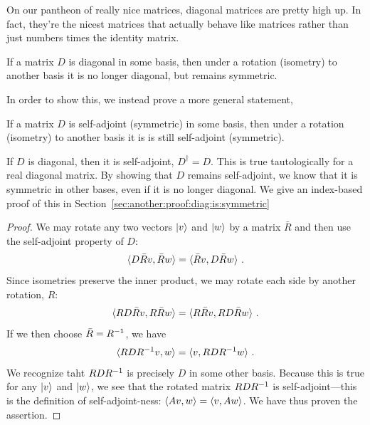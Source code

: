 \documentclass[12pt, oneside]{report}    %
\begin{document}
On our pantheon of really nice matrices, diagonal matrices are pretty high up. In fact, they're the nicest matrices that actually behave like matrices rather than just numbers times the identity matrix. 
\begin{bigidea}
If a matrix $D$ is diagonal in some basis, then under a rotation (isometry) to another basis it is no longer diagonal, but remains symmetric.
\end{bigidea}
In order to show this, we instead prove a more general statement,
\begin{theorem}\label{thm:symmetric:rotates:to:symmetric}
If a matrix $D$ is self-adjoint (symmetric) in some basis, then under a rotation (isometry) to another basis it is is still self-adjoint (symmetric).
\end{theorem} 
If $D$ is diagonal, then it is self-adjoint, $D^\dag = D$. This is true tautologically for a real diagonal matrix. By showing that $D$ remains self-adjoint, we know that it is symmetric in other bases, even if it is no longer diagonal. 
% 
We give an index-based proof of this in Section~\ref{sec:another:proof:diag:is:symmetric}
\begin{proof}
We may rotate any two vectors $\left|v\right\rangle$ and $\left|w\right\rangle$ by a matrix $\bar R$ and then use the self-adjoint property of $D$:
\begin{align}
    \langle D \bar R v, \bar R w \rangle
    =
    \langle  \bar R v, D \bar R w \rangle
    \ .
\end{align}
Since isometries preserve the inner product, we may rotate each side by another rotation, $R$:
\begin{align}
    \langle R D \bar R v,  R\bar R w \rangle
    =
    \langle R \bar R v, R D \bar R w \rangle
    \ .
\end{align}
If we then choose $\bar R = R^{-1}$, we have
\begin{align}
    \langle R D R^{-1}  v,  w \rangle
    =
    \langle v, R D R^{-1}  w \rangle \ .
\end{align}
We recognize taht $RDR^{-1}$ is precisely $D$ in some other basis.
Because this is true for any $\left|v\right\rangle$ and $\left|w\right\rangle$, we see that the rotated matrix $RDR^{-1}$ is self-adjoint---this is the definition of self-adjoint-ness: $\langle A v,w \rangle = \langle v, Aw \rangle$. We have thus proven the assertion.
\end{proof}
\end{document}
